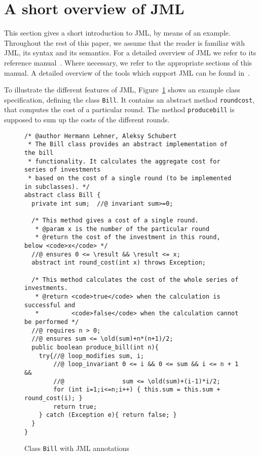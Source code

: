 \section{A short overview of JML}\label{SecJMLOverview}

This section gives a short introduction to JML, by means of an
example. Throughout the rest of this paper, we assume that the
reader is familiar with JML, its syntax and its semantics. For a
detailed overview of JML we refer to its reference
manual~\cite{JMLReferenceManual05}. Where necessary, we refer to the
appropriate sections of this manual. A detailed overview of the tools
which support JML can be found in~\cite{BurdyCCEKLLP05}.


To illustrate the different features of JML, Figure~\ref{FigJMLSpec}
shows an example class specification, defining the class
\texttt{Bill}. It contains an abstract method
\texttt{round\unsc cost}, that computes the cost of a particular
round. The method \texttt{produce\unsc bill} is supposed to sum up the
costs of the different rounds. 

\begin{figure}[th!]
{\small
\begin{verbatim}
/* @author Hermann Lehner, Aleksy Schubert
 * The Bill class provides an abstract implementation of the bill 
 * functionality. It calculates the aggregate cost for series of investments
 * based on the cost of a single round (to be implemented in subclasses). */
abstract class Bill {
  private int sum;  //@ invariant sum>=0;
 
  /* This method gives a cost of a single round.
   * @param x is the number of the particular round
   * @return the cost of the investment in this round, below <code>x</code> */
  //@ ensures 0 <= \result && \result <= x;
  abstract int round_cost(int x) throws Exception;
  
  /* This method calculates the cost of the whole series of investments.
   * @return <code>true</code> when the calculation is successful and
   *         <code>false</code> when the calculation cannot be performed */
  //@ requires n > 0;
  //@ ensures sum <= \old(sum)+n*(n+1)/2;
  public boolean produce_bill(int n){
    try{//@ loop_modifies sum, i;
        //@ loop_invariant 0 <= i && 0 <= sum && i <= n + 1 && 
        //@                sum <= \old(sum)+(i-1)*i/2;
        for (int i=1;i<=n;i++) { this.sum = this.sum + round_cost(i); }
        return true;
    } catch (Exception e){ return false; }
  }
}
\end{verbatim}
}
\caption{Class \texttt{Bill} with JML annotations} 
\label{FigJMLSpec}
\end{figure}



